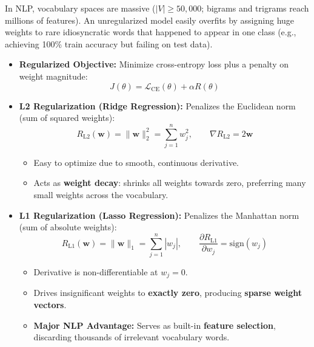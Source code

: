 \documentclass[10pt,a4paper]{article}
\begin{document}
\par\vspace{1pt}
In NLP, vocabulary spaces are massive ($|V| \ge 50{,}000$; bigrams and trigrams reach millions of features). An unregularized model easily overfits by assigning huge weights to rare idiosyncratic words that happened to appear in one class (e.g., achieving 100\% train accuracy but failing on test data).
\begin{itemize}[leftmargin=12pt, itemsep=0.5pt, parsep=0pt, topsep=0.5pt]
    \item \textbf{Regularized Objective:} Minimize cross-entropy loss plus a penalty on weight magnitude:
    \[
    J(\theta) = \mathcal{L}_{\text{CE}}(\theta) + \alpha R(\theta)
    \]
    \item \textbf{L2 Regularization (Ridge Regression):} Penalizes the Euclidean norm (sum of squared weights):
    \[
    R_{\text{L2}}(\mathbf{w}) = \|\mathbf{w}\|_2^2 = \sum_{j=1}^n w_j^2, \qquad \nabla R_{\text{L2}} = 2\mathbf{w}
    \]
    \begin{itemize}[leftmargin=12pt, itemsep=0.5pt, parsep=0pt]
        \item Easy to optimize due to smooth, continuous derivative.
        \item Acts as \textbf{weight decay}: shrinks all weights towards zero, preferring many small weights across the vocabulary.
    \end{itemize}
    \item \textbf{L1 Regularization (Lasso Regression):} Penalizes the Manhattan norm (sum of absolute weights):
    \[
    R_{\text{L1}}(\mathbf{w}) = \|\mathbf{w}\|_1 = \sum_{j=1}^n |w_j|, \qquad \frac{\partial R_{\text{L1}}}{\partial w_j} = \text{sign}(w_j)
    \]
    \begin{itemize}[leftmargin=12pt, itemsep=0.5pt, parsep=0pt]
        \item Derivative is non-differentiable at $w_j = 0$.
        \item Drives insignificant weights to \textbf{exactly zero}, producing \textbf{sparse weight vectors}.
        \item \textbf{Major NLP Advantage:} Serves as built-in \textbf{feature selection}, discarding thousands of irrelevant vocabulary words.
    \end{itemize}
\end{itemize}

\newpage
\end{document}

